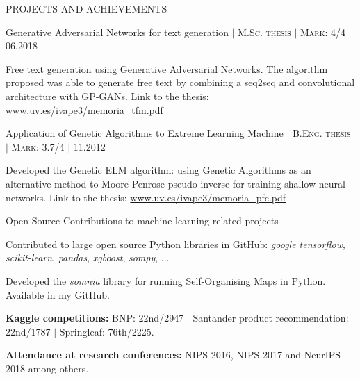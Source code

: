 \documentclass{resume} %
\begin{document}

\begin{rSection}{PROJECTS AND ACHIEVEMENTS}

\begin{rSubsection}{Generative Adversarial Networks for text generation  $|$  \textnormal{\textsc{M.Sc. thesis  $|$  Mark: 4/4}} $|$ \textnormal{06.2018}}{}{}{}  %

\vspace{-3pt}

\item Free text generation using Generative Adversarial Networks. The algorithm proposed was able to generate free text by combining a seq2seq and convolutional architecture with GP-GANs. Link to the thesis: \href{https://www.uv.es/ivape3/memoria_tfm.pdf}{www.uv.es/ivape3/memoria\_tfm.pdf}

\end{rSubsection}

\vspace{-6pt}

\begin{rSubsection}{Application of Genetic Algorithms to Extreme Learning Machine  $|$  \textnormal{\textsc{B.Eng. thesis  $|$  Mark: 3.7/4}} $|$ \textnormal{11.2012}}
{}{}{}  

\vspace{-3pt}

\item Developed the Genetic ELM algorithm: using Genetic Algorithms as an alternative method to Moore-Penrose pseudo-inverse for training shallow neural networks. Link to the thesis: \href{https://www.uv.es/ivape3/memoria_pfc.pdf}{www.uv.es/ivape3/memoria\_pfc.pdf}

\end{rSubsection}

\vspace{-6pt}

\begin{rSubsection}{Open Source Contributions to machine learning related projects}
	{}{}{}  
	
	\vspace{-3pt}
	
	\item Contributed to large open source Python libraries in GitHub: \textit{google tensorflow}, \textit{scikit-learn}, \textit{pandas}, \textit{xgboost}, \textit{sompy}, ... 
	\item Developed the \textit{somnia} library for running Self-Organising Maps in Python. Available in my GitHub.
\end{rSubsection}

\vspace{-6pt}

\textbf{Kaggle competitions:} BNP: 22nd/2947 $|$ Santander product recommendation: 22nd/1787 $|$ Springleaf: 76th/2225.

\vspace{-6pt}

\textbf{Attendance at research conferences:} NIPS 2016, NIPS 2017 and NeurIPS 2018 among others.


\end{rSection} 
\end{document}
